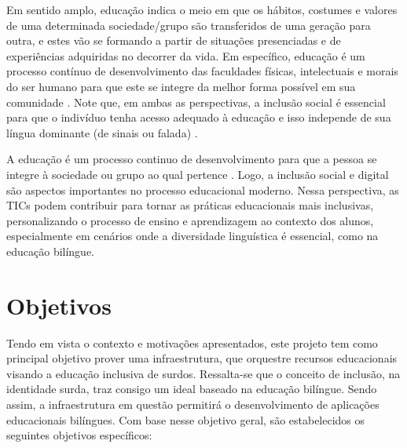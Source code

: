 Em sentido amplo, educação indica o meio em que os hábitos, costumes e valores de uma determinada sociedade/grupo são transferidos de uma geração para outra, e estes vão se formando a partir de situações presenciadas e de experiências adquiridas no decorrer da vida. Em específico, educação é um processo contínuo de desenvolvimento das faculdades físicas, intelectuais e morais do ser humano para que este se integre da melhor forma possível em sua comunidade \cite{Cilli2017,Quadros2019}. Note que, em ambas as perspectivas, a inclusão social é essencial para que o indivíduo tenha acesso adequado à educação e isso independe de sua língua dominante (de sinais ou falada) \cite{Quadros2019}. 

A educação é um processo continuo de desenvolvimento para que a pessoa se integre à sociedade ou grupo ao qual pertence \cite{Cilli2017,Quadros2019}. Logo, a inclusão social e digital são aspectos importantes no processo educacional moderno. Nessa perspectiva, as TICs podem contribuir para tornar as práticas educacionais mais inclusivas, personalizando o processo de ensino e aprendizagem ao contexto dos alunos, especialmente em cenários onde a diversidade linguística é essencial, como na educação bilíngue.

\section{Objetivos}

Tendo em vista o contexto e motivações apresentados, este projeto tem como principal objetivo prover uma infraestrutura, que orquestre recursos educacionais visando a educação inclusiva de surdos. Ressalta-se que o conceito de inclusão, na identidade surda, traz consigo um ideal baseado na educação bilíngue. Sendo assim, a infraestrutura em questão permitirá o desenvolvimento de aplicações educacionais bilíngues. %
Com base nesse objetivo geral, são estabelecidos os seguintes objetivos específicos:

